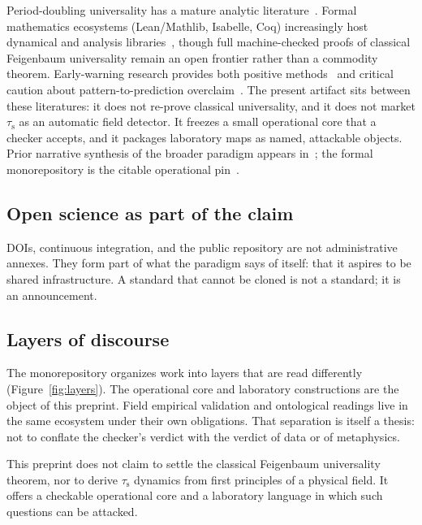 \documentclass[11pt,a4paper]{article}
\newcommand{\taus}{\tau_{\mathrm{s}}}
\begin{document}
Period-doubling universality has a mature analytic literature~\cite{feigenbaum1978,briggs1991,deMellovanStrien,lyubich1999,singer1978}.
Formal mathematics ecosystems (Lean/Mathlib, Isabelle, Coq) increasingly host dynamical and analysis libraries~\cite{lean4,mathlib}, though full machine-checked proofs of classical Feigenbaum universality remain an open frontier rather than a commodity theorem.
Early-warning research provides both positive methods~\cite{scheffer2009,dakos2012} and critical caution about pattern-to-prediction overclaim~\cite{boettiger2013,boettiger2012}.
The present artifact sits between these literatures: it does not re-prove classical universality, and it does not market \(\taus\) as an automatic field detector. It freezes a small operational core that a checker accepts, and it packages laboratory maps as named, attackable objects. Prior narrative synthesis of the broader paradigm appears in~\cite{padilla2026magna}; the formal monorepository is the citable operational pin~\cite{systemic-tau-formal}.

\subsection{Open science as part of the claim}

DOIs, continuous integration, and the public repository are not administrative annexes. They form part of what the paradigm says of itself: that it aspires to be shared infrastructure. A standard that cannot be cloned is not a standard; it is an announcement.

\subsection{Layers of discourse}

The monorepository organizes work into layers that are read differently (Figure~\ref{fig:layers}). The operational core and laboratory constructions are the object of this preprint. Field empirical validation and ontological readings live in the same ecosystem under their own obligations. That separation is itself a thesis: not to conflate the checker's verdict with the verdict of data or of metaphysics.

This preprint does not claim to settle the classical Feigenbaum universality theorem, nor to derive \(\taus\) dynamics from first principles of a physical field. It offers a checkable operational core and a laboratory language in which such questions can be attacked.
\end{document}
